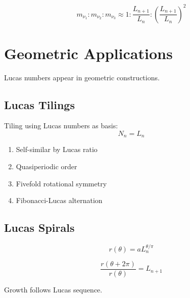 \begin{theorem}
\label{fa_29:thm:neutrino-lucas}
\begin{equation}
m_{\nu_1}:m_{\nu_2}:m_{\nu_3} \approx 1:\frac{L_{n+1}}{L_n}:\left(\frac{L_{n+1}}{L_n}\right)^2
\end{equation}
\end{theorem}

\section{Geometric Applications}

Lucas numbers appear in geometric constructions.

\subsection{Lucas Tilings}

\begin{definition}
\label{fa_29:def:lucas-tiling}
Tiling using Lucas numbers as basis:
\begin{equation}
N_n = L_n
\end{equation}
\end{definition}

\begin{proposition}
\label{fa_29:prop:lucas-tiling}
\begin{enumerate}
    \item Self-similar by Lucas ratio
    \item Quasiperiodic order
    \item Fivefold rotational symmetry
    \item Fibonacci-Lucas alternation
\end{enumerate}
\end{proposition}

\subsection{Lucas Spirals}

\begin{definition}
\label{fa_29:def:lucas-spiral}
\begin{equation}
r(\theta) = a L_n^{\theta/\pi}
\end{equation}
\end{definition}

\begin{theorem}
\label{fa_29:thm:lucas-spiral}
\begin{equation}
\frac{r(\theta + 2\pi)}{r(\theta)} = L_{n+1}
\end{equation}

Growth follows Lucas sequence.
\end{theorem}

